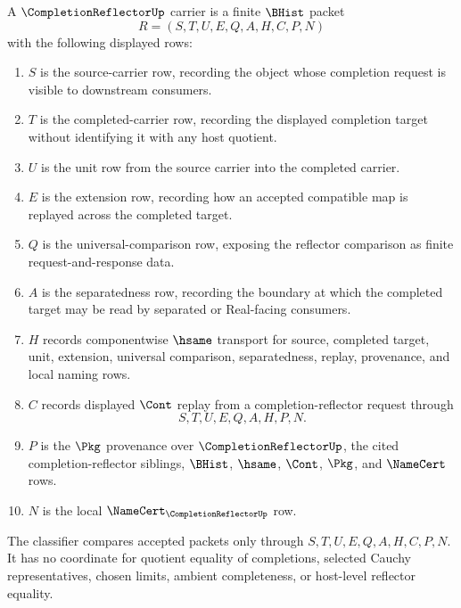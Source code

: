 \begin{definition}
\label{def:completion-reflector-carrier}
A $\CompletionReflectorUp$ carrier is a finite $\BHist$ packet
$$
R=(S,T,U,E,Q,A,H,C,P,N)
$$
with the following displayed rows:
\begin{enumerate}
\item $S$ is the source-carrier row, recording the object whose completion request is visible to downstream consumers.
\item $T$ is the completed-carrier row, recording the displayed completion target without identifying it with any host quotient.
\item $U$ is the unit row from the source carrier into the completed carrier.
\item $E$ is the extension row, recording how an accepted compatible map is replayed across the completed target.
\item $Q$ is the universal-comparison row, exposing the reflector comparison as finite request-and-response data.
\item $A$ is the separatedness row, recording the boundary at which the completed target may be read by separated or Real-facing consumers.
\item $H$ records componentwise $\hsame$ transport for source, completed target, unit, extension, universal comparison, separatedness, replay, provenance, and local naming rows.
\item $C$ records displayed $\Cont$ replay from a completion-reflector request through
$$
S,T,U,E,Q,A,H,P,N .
$$
\item $P$ is the $\Pkg$ provenance over $\CompletionReflectorUp$, the cited completion-reflector siblings, $\BHist$, $\hsame$, $\Cont$, $\Pkg$, and $\NameCert$ rows.
\item $N$ is the local $\NameCert_{\CompletionReflectorUp}$ row.
\end{enumerate}
The classifier compares accepted packets only through $S,T,U,E,Q,A,H,C,P,N$. It has no coordinate for quotient equality of completions, selected Cauchy representatives, chosen limits, ambient completeness, or host-level reflector equality.
\end{definition}

